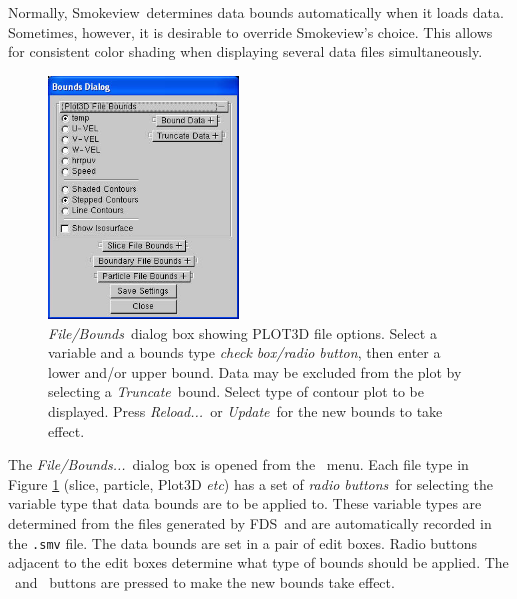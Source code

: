 \documentclass[11pt,twoside]{book}
\newcommand{\figoptions}{hbp}
\newcommand{\fds}{{FDS}}
\newcommand{\smokeview}{{Smokeview}}
\newcommand{\etc}{{\em etc}}
\newcommand{\frameit}[1]{\fbox{\tt #1}}
\begin{document}
Normally, \smokeview\ determines data bounds automatically
when it loads data. Sometimes, however, it is desirable to
override \smokeview's choice.  This allows for consistent
color shading when displaying several data files
simultaneously.

\begin{figure}[\figoptions]
\centerline{
\includegraphics[width=1.993055in]{figures/figBOUNDSplot3d}
}
\caption[{\em File/Bounds}\ dialog box showing PLOT3D file options.]
{{\em File/Bounds}\ dialog box showing PLOT3D file options. Select a
variable and a bounds type {\em check box/radio button}, then enter
a lower and/or upper bound. Data may be excluded from the plot by
selecting a {\em Truncate}\ bound.  Select type of contour plot to be
displayed. Press {\em Reload...}\ or {\em Update}\ for the new bounds to
take effect.} \label{figBOUNDSplot3d}
\end{figure}

The {\em File/Bounds...}\ dialog box is opened from the
\frameit{Dialogs}\ menu. Each file type in Figure
\ref{figBOUNDSplot3d} (slice, particle, Plot3D \etc) has a set of
{\em radio buttons}\ for selecting the variable type that data bounds
are to be applied to. These variable types are determined from the
files generated by \fds\ and are automatically recorded in the
{\tt .smv} file. The data bounds are set in a pair of edit boxes.
Radio buttons adjacent to the edit boxes determine what type of
bounds should be applied.  The \frameit{Update}\ and
\frameit{Reload}\ buttons are pressed to make the new bounds take
effect.
\end{document}
